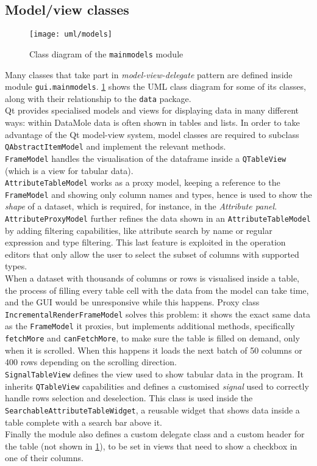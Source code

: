 \subsection{Model/view classes}
\begin{figure}[ht]
	\centering
	\texttt{[image: uml/models]}
	\caption{Class diagram of the \texttt{mainmodels} module}
	\label{fig:modelsuml}
\end{figure}
Many classes that take part in \textit{model-view-delegate} pattern are defined inside module \texttt{gui.mainmodels}. \cref{fig:modelsuml} shows the UML class diagram for some of its classes, along with their relationship to the \texttt{data} package.\\
Qt provides specialised models and views for displaying data in many different ways: within DataMole data is often shown in tables and lists.
In order to take advantage of the Qt model-view system, model classes are required to subclass \texttt{QAbstractItemModel} and implement the relevant methods.\\
\texttt{FrameModel} handles the visualisation of the dataframe inside a \texttt{QTableView} (which is a view for tabular data).\\
\texttt{AttributeTableModel} works as a proxy model, keeping a reference to the \texttt{FrameModel} and showing only column names and types, hence is used to show the \textit{shape} of a dataset, which is required, for instance, in the \textit{Attribute panel}.\\
\texttt{AttributeProxyModel} further refines the data shown in an \texttt{AttributeTableModel} by adding filtering capabilities, like attribute search by name or regular expression and type filtering. This last feature is exploited in the operation editors that only allow the user to select the subset of columns with supported types.\\ 
When a dataset with thousands of columns or rows is visualised inside a table, the process of filling every table cell with the data from the model can take time, and the GUI would be unresponsive while this happens. Proxy class \texttt{IncrementalRenderFrameModel} solves this problem: it shows the exact same data as the \texttt{FrameModel} it proxies, but implements additional methods, specifically \texttt{fetchMore} and \texttt{canFetchMore}, to make sure the table is filled on demand, only when it is scrolled. When this happens it loads the next batch of 50 columns or 400 rows depending on the scrolling direction.\\
\texttt{SignalTableView} defines the view used to show tabular data in the program. It inherits \texttt{QTableView} capabilities and defines a customised \textit{signal} used to correctly handle rows selection and deselection. This class is used inside the \texttt{SearchableAttributeTableWidget}, a reusable widget that shows data inside a table complete with a search bar above it.\\
Finally the module also defines a custom delegate class and a custom header for the table (not shown in \cref{fig:modelsuml}), to be set in views that need to show a checkbox in one of their columns.


